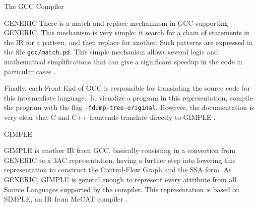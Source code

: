 \begin{section}{The GCC Compiler}
\begin{subsection}{GENERIC}
	There is a match-and-replace mechaninsm in GCC supporting GENERIC. This
	mechanism is very simple: it search for a chain of statements in the IR
	for a pattern, and then replace for another. Such patterns are expressed
	in the file \texttt{gcc/match.pd}. This simple mechanism allows several
	logic and mathematical simplifications that can give a significant speedup
	in the code in particular cases \citep{sinatan}.




	Finally, each Front End of GCC is responsible for translating the source
	code for this intermediate language. To visualize a program in this representation,
	compile the program with the flag \texttt{-fdump-tree-original}. However,
	the documentation is very clear that C and C++ frontends translate
	directly to GIMPLE \citep{gimple}.

\end{subsection}

\begin{subsection}{GIMPLE}

GIMPLE is another IR from GCC, basically consisting in a convertion from
GENERIC to a 3AC representation, having a further step into lowering this
representation to construct the Control-Flow Graph and the SSA form. As
GENERIC, GIMPLE is general enough to represent
every attribute from all Source Languages supported by the compiler. This
representation is based on SIMPLE, an IR from McCAT compiler \citep{gimple}.


\end{subsection}
\end{section}
